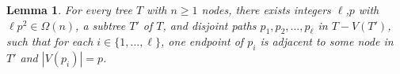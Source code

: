 \documentclass[12pt]{article}
\DeclarePairedDelimiter{\floor}{\lfloor}{\rfloor}
\renewcommand{\ge}{\geqslant}
\newcommand{\PP}{\mathcal{P}}
\theoremstyle{plain}
\newtheorem{lem}[thm]{Lemma}
\theoremstyle{definition}
\begin{document}



\begin{lem}\label{newer_subdivided_star_minor}
    For every tree $T$ with $n \ge 1$ nodes, there exists integers $\ell$,$p$ with $\ell p^2 \in \Omega(n)$, a subtree $T'$ of $T$, and disjoint paths $p_1, p_2, ..., p_\ell$ in $T - V(T')$, such that for each $i \in \{1,...,\ell\}$, one endpoint of $p_i$ is adjacent to some node in $T'$ and $|V(p_i)| = p$.
\end{lem} 
\end{document}

